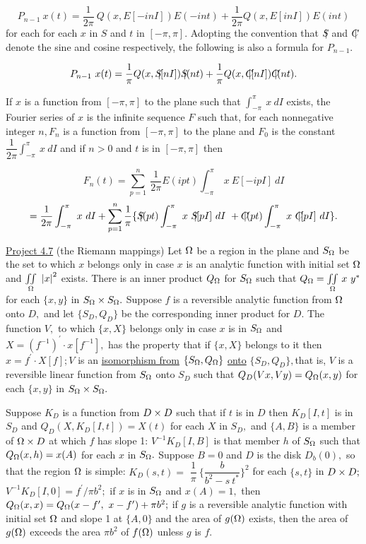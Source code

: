 \[
P_{n-1}~x(t) = \dfrac{1}{2\pi}~Q(x,E[-inI])E(-int) + \dfrac{1}{2\pi}Q(x,E[inI])E(int)
\]
for each for each $x$ in $S$ and $t$ in $[-\pi,\pi].$  Adopting the convention that $S\hspace{-4pt}\vert$ and $C\hspace{-5pt}\vert$ denote the sine and cosine respectively, the following is also a formula for $P_{n-1}.$\nl

\[
P_{n-1}~x(t) = \dfrac{1}{\pi}Q(x,S\hspace{-4pt}\vert[nI])S\hspace{-4pt}\vert(nt) + \dfrac{1}{\pi}Q(x,C\hspace{-5pt}\vert[nI])C\hspace{-5pt}\vert(nt).
\]

If $x$ is a function from $[-\pi,\pi]$ to the plane such that $\int_{-\pi}^{\pi}~x~dI$ exists, the Fourier series of $x$ is the infinite sequence $F$ such that, for each nonnegative integer $n, F_{n}$ is a function from $[-\pi,\pi]$ to the plane  and $F_{0}$ is the constant $\dfrac{1}{2\pi}\int_{-\pi}^{\pi}~x~dI$ and if $n > 0$ and $t$ is in $[-\pi,\pi]$ then\nl


\[
F_{n}(t) = \sum_{p=1}^{n}~\dfrac{1}{2\pi}E(ipt)\int_{-\pi}^{\pi}~x~E[-ipI]~dI
\]
\[
= \dfrac{1}{2\pi}\int_{-\pi}^{\pi}~x~dI + \sum_{p=1}^{n}\dfrac{1}{\pi}\{S\hspace{-4pt}\vert(pt)\int_{-\pi}^{\pi}~x~  S\hspace{-4pt}\vert[pI]~dI~ + C\hspace{-5pt}\vert(pt)\int_{-\pi}^{\pi}~x~ C\hspace{-5pt}\vert[pI]~dI\}.
\]

\ul{Project 4.7}  (the Riemann mappings)  Let $\Omega$ be a region in the plane and $S_{\Omega}$ be the set to which $x$ belongs only in case $x$ is an analytic function with initial set $\Omega$ and $\underset{\Omega}{\iint}~\left|x\right|^{2}$ exists.  There is an inner product $Q_{\Omega}$ for $S_{\Omega}$ such that $Q_{\Omega} = \underset{\Omega}{\iint}~x~y^{*}$ for each $\{x,y\}$ in $S_{\Omega} \times S_{\Omega}.$  Suppose $f$ is a reversible analytic function from $\Omega$ onto $D,$ and let $\{S_{D}, Q_{D}\}$ be the corresponding inner product for $D.$  The function $V,$ to which $\{x,X\}$ belongs only in case $x$ is in $S_{\Omega}$ and $X =(f^{-1})^{\prime}\cdot x[f^{-1}],$ has the property that if $\{x,X\}$ belongs to it then $x = f^{\prime}\cdot X[f]; V$ is an \ul{isomorphism from} $\{S_{\Omega}, Q_{\Omega}\}$ \ul{onto} $\{S_{D},Q_{D}\},$that is, $V$ is a reversible linear function from $S_{\Omega}$ onto $S_{D}$ such that $Q_{D}(Vx,Vy) = Q_{\Omega}(x,y)$ for each $\{x,y\}$ in $S_{\Omega} \times S_{\Omega}.$\nl

Suppose $K_{D}$ is a function from $D \times D$ such that if $t$ is in $D$ then $K_{D}[I,t]$ is in $S_{D}$ and $Q_{D}(X,K_{D}[I,t]) = X(t)$ for each $X$ in $S_{D},$ and $\{A,B\}$ is a member of $\Omega \times D$ at which $f$ has slope 1:  $V^{-1}K_{D}[I,B]$ is that member $h$ of $S_{\Omega}$ such that $Q_{\Omega}(x,h) = x(A)$ for each $x$ in $S_{\Omega}.$  Suppose $B = 0$ and $D$ is the disk $D_{b}(0),$ so that the region $\Omega$ is simple:  $K_{D}(s,t) =$ $ \dfrac{1}{\pi}~\{\dfrac{b}{b^{2} - s~t^{*}}\}^{2}$ for each $\{s,t\}$ in $D \times D;$ $V^{-1}K_{D}[I,0] = f^{\prime}/\pi b^{2};$  if $x$ is in $S_{\Omega}$ and $x(A) = 1,$ then $Q_{\Omega}(x,x) = Q_{\Omega}(x - f^{\prime},~x - f^{\prime}) + \pi b^{2};$  if $g$ is a reversible analytic function with initial set $\Omega$ and slope 1 at $\{A,0\}$ and the area of $g(\Omega)$ exists, then the area of $g(\Omega)$ exceeds the area $\pi b^{2}$ of $f(\Omega)$ unless $g$ is $f.$\np

